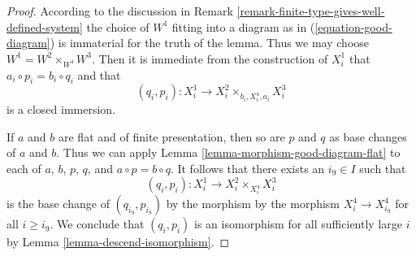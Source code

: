 \begin{proof}
According to the discussion in
Remark \ref{remark-finite-type-gives-well-defined-system}
the choice of $W^1$ fitting into a diagram as in
(\ref{equation-good-diagram}) is immaterial for the truth of
the lemma. Thus we may choose $W^1 = W^2 \times_{W^4} W^3$.
Then it is immediate from the construction of $X^1_i$ that 
$a_i \circ p_i = b_i \circ q_i$ and that
$$
(q_i, p_i) : X^1_i \longrightarrow X^2_i \times_{b_i, X^4_i, a_i} X^3_i
$$
is a closed immersion.

\medskip\noindent
If $a$ and $b$ are flat and of finite presentation, then so are
$p$ and $q$ as base changes of $a$ and $b$. Thus we can apply
Lemma \ref{lemma-morphism-good-diagram-flat}
to each of $a$, $b$, $p$, $q$, and $a \circ p = b \circ q$.
It follows that there exists an $i_9 \in I$ such that
$$
(q_i, p_i) : X^1_i \to X^2_i \times_{X^4_i} X^3_i
$$
is the base change of $(q_{i_9}, p_{i_9})$ by the morphism
by the morphism $X^4_i \to X^4_{i_9}$ for all $i \geq i_9$.
We conclude that $(q_i, p_i)$ is an isomorphism for all sufficiently
large $i$ by Lemma \ref{lemma-descend-isomorphism}.
\end{proof}














